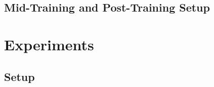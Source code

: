 \documentclass{article}
\begin{document}
\subsection{Mid-Training and Post-Training Setup}
\label{sec:method:setup}



\section{Experiments}
\label{sec:exp}


\subsection{Setup}
\label{sec:exp:setup}

\end{document}

